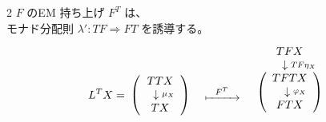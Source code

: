 \documentclass[
		head_space=20mm,
		foot_space=20mm,
		gutter=10mm,
		line_length=190mm
]{jlreq}
\begin{document}
\begin{supplement}
\begin{multicols}{2}
		$F$ のEM 持ち上げ $F^T$ は、\\ モナド分配則 $\lambda':TF\Rightarrow FT$ を誘導する。\vspace{-3pt}
		\begin{align*}
			\begin{array}{ccccc}
				\substack{~~~\\[25pt]\displaystyle L^TX=}\!\!\! & \substack{~~~\\[28pt]\left(\begin{array}{c} TTX \\ ~~\downarrow \substack{\mu_X} \\ TX \end{array}\right)}~ & \substack{\displaystyle ~~~\\[25pt] \displaystyle \xmapsto{~~F^T~~}} & 
				\substack{ \begin{array}{c}\displaystyle TFX \\ ~~~~\downarrow\substack{TF\eta_X}\!\! \\
				\substack{\left(\begin{array}{c} TFTX \\ ~~~\downarrow \substack{\varphi_X} \\ FTX \end{array}\right)}\end{array}}
			\end{array}
		\end{align*}
	\end{multicols}
\end{supplement}
\end{document}
